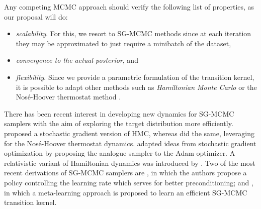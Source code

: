Any competing MCMC approach should verify the following list of properties, as our proposal will do:
\begin{itemize}
    \item \emph{scalability}. For this, we resort to SG-MCMC methods since at each iteration they may be approximated to just require a minibatch of the dataset,
    \item \emph{convergence to the actual posterior}, and
    \item \emph{flexibility}. Since we provide a parametric formulation of the transition kernel, it is possible to adapt other methods such as \emph{Hamiltonian Monte Carlo} \parencite{neal2011mcmc} or the Nos\'e-Hoover thermostat method \parencite{ding2014bayesian}.
\end{itemize}
There has been recent interest in developing new dynamics for SG-MCMC samplers with the aim of exploring the target distribution more efficiently. \textcite{chen2014stochastic} proposed a stochastic gradient version of HMC, whereas \textcite{ding2014bayesian} did the same, leveraging for the Nos\'e-Hoover thermostat dynamics. \textcite{chen2016bridging} adapted ideas from stochastic gradient optimization by proposing the analogue sampler to the Adam optimizer. A relativistic variant of Hamiltonian dynamics was introduced by \textcite{abbati2018adageo}. Two of the most recent derivations of SG-MCMC samplers are \textcite{zhang2019cyclical}, in which the authors propose a policy controlling the learning rate which serves for better preconditioning; and \textcite{gong2019meta}, in which a meta-learning approach is proposed to learn an efficient SG-MCMC transition kernel.
